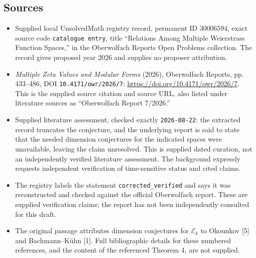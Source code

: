 \documentclass[11pt]{article}
\begin{document}
\subsection{Sources}
\begin{itemize}
\item Supplied local UnsolvedMath registry record, permanent ID \(30006594\), exact source code \texttt{catalogue entry}, title ``Relations Among Multiple Weierstrass Function Spaces,'' in the Oberwolfach Reports Open Problems collection. The record gives proposed year 2026 and supplies no proposer attribution.
\item \emph{Multiple Zeta Values and Modular Forms} (2026), Oberwolfach Reports, pp. 433--486, DOI \texttt{10.4171/owr/2026/7}: \url{https://doi.org/10.4171/owr/2026/7}. This is the supplied source citation and source URL, also listed under literature sources as ``Oberwolfach Report 7/2026.''
\item Supplied literature assessment, checked exactly \texttt{2026-08-22}: the extracted record truncates the conjecture, and the underlying report is said to state that the needed dimension conjectures for the indicated spaces were unavailable, leaving the claim unresolved. This is supplied dated curation, not an independently verified literature assessment. The background expressly requests independent verification of time-sensitive status and cited claims.
\item The registry labels the statement \texttt{corrected\_verified} and says it was reconstructed and checked against the official Oberwolfach report. These are supplied verification claims; the report has not been independently consulted for this draft.
\item The original passage attributes dimension conjectures for \(\mathcal E_k\) to Okounkov [5] and Bachmann--K\"uhn [1]. Full bibliographic details for these numbered references, and the content of the referenced Theorem 4, are not supplied.
\end{itemize}
\end{document}
